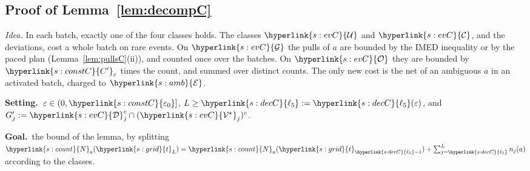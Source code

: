 \documentclass[10pt]{article}
\newcommand{\sy}[2]{{\hyperlink{#1}{#2}}}
\newcommand{\1}{\mathbf{1}}
\newcommand{\Ng}{\sy{s:count}{N}}
\newcommand{\tl}{\sy{s:grid}{t}}
\newcommand{\ez}{\sy{s:constC}{\varepsilon_0}}
\newcommand{\Cg}{\sy{s:constC}{C'}}
\newcommand{\Dev}{\sy{s:evC}{\mathcal D}}
\newcommand{\Vs}{\sy{s:evC}{\mathcal V^\star}}
\newcommand{\cU}{\sy{s:evC}{\mathcal U}}
\newcommand{\cG}{\sy{s:evC}{\mathcal G}}
\newcommand{\cC}{\sy{s:evC}{\mathcal C}}
\newcommand{\cO}{\sy{s:evC}{\mathcal O}}
\newcommand{\Eamb}{\sy{s:amb}{\mathcal E}}
\newcommand{\lfive}{\sy{s:decC}{\ell_5}}
\newcommand{\Setting}{\noindent\textbf{Setting.}\ }
\newcommand{\Goal}{\par\smallskip\noindent\textbf{Goal.}\ }
\begin{document}
\subsection{Proof of Lemma~\ref{lem:decompC}}\label{sec:pf-lem:decompC}
\noindent\emph{Idea.} In each batch, exactly one of the four classes holds. The classes $\cU$ and $\cC$, and the deviations, cost a whole batch on rare events. On $\cG$
the pulls of $a$ are bounded by the IMED inequality or by the paced plan (Lemma~\ref{lem:pullsC}(ii)), and counted once over the batches. On $\cO$ they are bounded by
$\Cg_\varepsilon$ times the count, and summed over distinct counts. The only new cost is the net of an ambiguous $a$ in an activated batch, charged to $\Eamb$.

\begin{setgoal}
\Setting $\varepsilon\in(0,\ez]$, $L\ge\lfive:=\lfive(\varepsilon)$, and $G'_j:=\Dev_j^c\cap(\Vs_j)^c$.
\Goal the bound of the lemma, by splitting $\Ng_a(\tl_L)=\Ng_a(\tl_{\lfive-1})+\sum_{j=\lfive}^Ln_j(a)$ according to the classes.
\end{setgoal}
\end{document}
